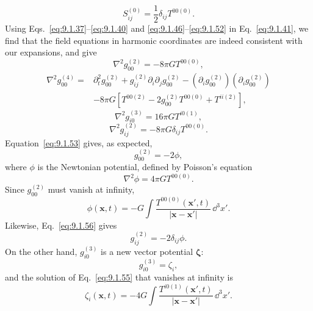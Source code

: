 \begin{equation}
  S_{ij}^{(0)}=\frac12\delta_{ij}T^{00(0)}.
  \tag{9.1.52}\label{eq:9.1.52}
\end{equation}
Using Eqs.~\eqref{eq:9.1.37}--\eqref{eq:9.1.40} and
\eqref{eq:9.1.46}--\eqref{eq:9.1.52} in Eq.~\eqref{eq:9.1.41}, we find
that the field equations in harmonic coordinates are indeed consistent with
our expansions, and give
\begin{equation}
  \nabla^2g_{00}^{(2)}=-8\pi G T^{00(0)},
  \tag{9.1.53}\label{eq:9.1.53}
\end{equation}
\begin{equation}
  \begin{split}
  \nabla^2g_{00}^{(4)}={}&
  \partial_t^2g_{00}^{(2)}
  +g_{ij}^{(2)}\partial_i\partial_jg_{00}^{(2)}
  -(\partial_i g_{00}^{(2)})(\partial_i g_{00}^{(2)})\\
  &-8\pi G\left[
    T^{00(2)}
    -2g_{00}^{(2)}T^{00(0)}
    +T^{ii(2)}
  \right],
  \end{split}
  \tag{9.1.54}\label{eq:9.1.54}
\end{equation}
\begin{equation}
  \nabla^2g_{i0}^{(3)}=16\pi G T^{i0(1)},
  \tag{9.1.55}\label{eq:9.1.55}
\end{equation}
\begin{equation}
  \nabla^2g_{ij}^{(2)}
  =-8\pi G\delta_{ij}T^{00(0)}.
  \tag{9.1.56}\label{eq:9.1.56}
\end{equation}
Equation~\eqref{eq:9.1.53} gives, as expected,
\begin{equation}
  g_{00}^{(2)}=-2\phi,
  \tag{9.1.57}\label{eq:9.1.57}
\end{equation}
where \(\phi\) is the Newtonian potential, defined by Poisson's equation
\begin{equation}
  \nabla^2\phi=4\pi G T^{00(0)}.
  \tag{9.1.58}\label{eq:9.1.58}
\end{equation}
Since \(g_{00}^{(2)}\) must vanish at infinity,
\begin{equation}
  \phi(\mathbf x,t)
  =
  -G\int\frac{T^{00(0)}(\mathbf x',t)}
  {|\mathbf x-\mathbf x'|}\,\dd^3x'.
  \tag{9.1.59}\label{eq:9.1.59}
\end{equation}
Likewise, Eq.~\eqref{eq:9.1.56} gives
\begin{equation}
  g_{ij}^{(2)}=-2\delta_{ij}\phi.
  \tag{9.1.60}\label{eq:9.1.60}
\end{equation}
On the other hand, \(g_{i0}^{(3)}\) is a new vector potential
\(\boldsymbol\zeta\):
\begin{equation}
  g_{i0}^{(3)}=\zeta_i,
  \tag{9.1.61}\label{eq:9.1.61}
\end{equation}
and the solution of Eq.~\eqref{eq:9.1.55} that vanishes at infinity is
\begin{equation}
  \zeta_i(\mathbf x,t)
  =
  -4G\int\frac{T^{i0(1)}(\mathbf x',t)}
  {|\mathbf x-\mathbf x'|}\,\dd^3x'.
  \tag{9.1.62}\label{eq:9.1.62}
\end{equation}

